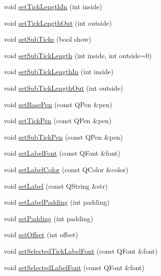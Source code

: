 \begin{DoxyCompactItemize}
\item 
void \hyperlink{classQCPAxis_afae1a37a99611366275a51204d991739}{set\+Tick\+Length\+In} (int inside)
\item 
void \hyperlink{classQCPAxis_a3b8a0debd1ffedd2c22d0592dfbb4e62}{set\+Tick\+Length\+Out} (int outside)
\item 
void \hyperlink{classQCPAxis_afa0ce8d4d0015ed23dcde01f8bc30106}{set\+Sub\+Ticks} (bool show)
\item 
void \hyperlink{classQCPAxis_ab702d6fd42fc620607435339a1c2a2e1}{set\+Sub\+Tick\+Length} (int inside, int outside=0)
\item 
void \hyperlink{classQCPAxis_ac46fa2a993a9f5789540977610acf1de}{set\+Sub\+Tick\+Length\+In} (int inside)
\item 
void \hyperlink{classQCPAxis_a4c6dfc3963492ed72a77724012df5f23}{set\+Sub\+Tick\+Length\+Out} (int outside)
\item 
void \hyperlink{classQCPAxis_a778d45fb71b3c7ab3bb7079e18b058e4}{set\+Base\+Pen} (const Q\+Pen \&pen)
\item 
void \hyperlink{classQCPAxis_ad80923bcc1c5da4c4db602c5325e797e}{set\+Tick\+Pen} (const Q\+Pen \&pen)
\item 
void \hyperlink{classQCPAxis_aede4028ae7516bd51a60618a8233f9cf}{set\+Sub\+Tick\+Pen} (const Q\+Pen \&pen)
\item 
void \hyperlink{classQCPAxis_a71ac1a47f7547e490a8c4311d1433cf3}{set\+Label\+Font} (const Q\+Font \&font)
\item 
void \hyperlink{classQCPAxis_a6c906fe56d75f0122335b9f79b999608}{set\+Label\+Color} (const Q\+Color \&color)
\item 
void \hyperlink{classQCPAxis_a33bcc382c111c9f31bb0687352a2dea4}{set\+Label} (const Q\+String \&str)
\item 
void \hyperlink{classQCPAxis_a4391192a766e5d20cfe5cbc17607a7a2}{set\+Label\+Padding} (int padding)
\item 
void \hyperlink{classQCPAxis_a5691441cb3de9e9844855d339c0db279}{set\+Padding} (int padding)
\item 
void \hyperlink{classQCPAxis_a04a652603cbe50eba9969ee6d68873c3}{set\+Offset} (int offset)
\item 
void \hyperlink{classQCPAxis_a845ccb560b7bc5281098a5be494145f6}{set\+Selected\+Tick\+Label\+Font} (const Q\+Font \&font)
\item 
void \hyperlink{classQCPAxis_a02ec2a75d4d8401eaab834fbc6803d30}{set\+Selected\+Label\+Font} (const Q\+Font \&font)
\item 

\end{DoxyCompactItemize}
